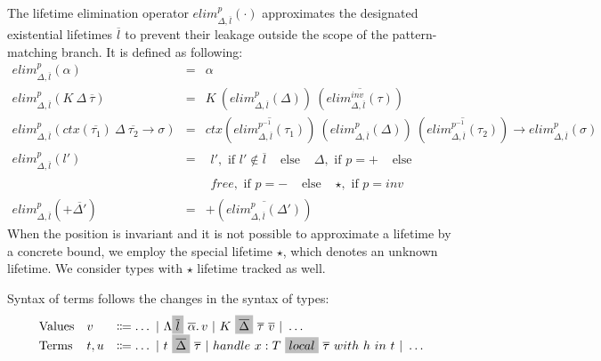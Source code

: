 \documentclass[acmsmall,review,screen]{acmart}
\newcommand{\graybox}[1]{\colorbox{lightgray}{$\displaystyle #1$}}
\newcommand{\vor}{~|~}
\newcommand{\ap}{~}
\newcommand{\ctx}[1]{ctx\left(#1\right)~}
\begin{document}
The lifetime elimination operator $elim_{\Delta, \overline{l}}^p(\cdot)$ approximates the designated existential lifetimes $\overline{l}$ to prevent their leakage outside the scope of the pattern-matching branch.
It is defined as following:
\[
    \begin{array}{lll}
        elim_{\Delta, \overline{l}}^p(\alpha) & = & \alpha \\
        elim_{\Delta, \overline{l}}^p(K\ap \Delta\ap\overline{\tau}) & = & K\ap \left( elim_{\Delta, \overline{l}}^p(\Delta) \right)\ap\left( \overline{elim_{\Delta, \overline{l}}^{inv}(\tau)} \right) \\
        elim_{\Delta, \overline{l}}^p(\ctx{\overline{\tau_1}}\Delta~\overline{\tau_2}\to\sigma) & = & \ctx{\overline{elim_{\Delta, \overline{l}}^{p^{-1}}(\tau_1)}} \left( elim_{\Delta, \overline{l}}^p(\Delta) \right)\ap\left( \overline{elim_{\Delta, \overline{l}}^{p^{-1}}(\tau_2)} \right)\to elim_{\Delta, \overline{l}}^{p}(\sigma) \\
        elim_{\Delta, \overline{l}}^{p}(l') & = &
        \begin{array}{llll}
             l', \text{ if } l' \not\in\overline{l} & \text{ else } &
             \Delta, \text{ if } p = + & \text{ else }
        \end{array} \\
        &&
        \begin{array}{llll}
            free, \text{ if } p = - & \text{ else } &
            \star, \text{ if } p = inv
        \end{array} \\
        elim_{\Delta, \overline{l}}^{p}(+\overline{\Delta'}) & = & +\left( \overline{elim_{\Delta, \overline{l}}^{p}(\Delta')} \right)
    \end{array}
\]
When the position is invariant and it is not possible to approximate a lifetime by a concrete bound, we employ the special lifetime $\star$, which denotes an unknown lifetime.
We consider types with $\star$ lifetime tracked as well.

Syntax of terms follows the changes in the syntax of types:
\[
    \begin{array}{lll}
        \text{Values} & v & \Coloneqq \ldots \vor \Lambda \graybox{\overline{l}}\ap\overline{\alpha}\ldotp v \vor K\ap\graybox{\overline{\Delta}}\ap\overline{\tau}\ap\overline{v} \vor \ldots \\
        \text{Terms} & t, u &\Coloneqq \ldots \vor t\ap\graybox{\overline{\Delta}}\ap\overline{\tau} \vor handle ~ x : T \ap\graybox{local}\ap \overline{\tau} ~with ~h~in ~t \vor \ldots
    \end{array}
\]
\end{document}
